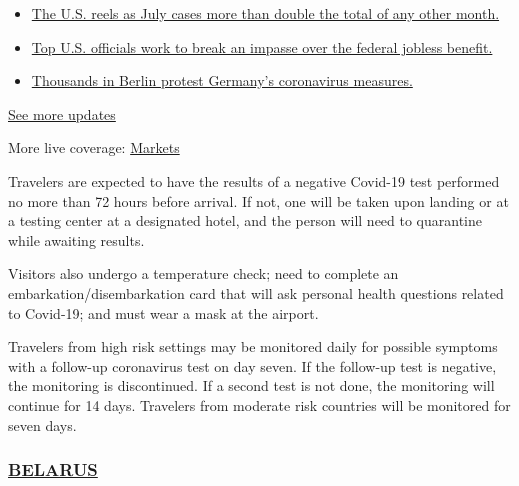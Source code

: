 \begin{itemize}
\tightlist
\item
  \href{https://www.nytimes.com/2020/08/01/world/coronavirus-covid-19.html?action=click\&pgtype=Article\&state=default\&region=MAIN_CONTENT_1\&context=storylines_live_updates\#link-34047410}{The
  U.S. reels as July cases more than double the total of any other
  month.}
\item
  \href{https://www.nytimes.com/2020/08/01/world/coronavirus-covid-19.html?action=click\&pgtype=Article\&state=default\&region=MAIN_CONTENT_1\&context=storylines_live_updates\#link-780ec966}{Top
  U.S. officials work to break an impasse over the federal jobless
  benefit.}
\item
  \href{https://www.nytimes.com/2020/08/01/world/coronavirus-covid-19.html?action=click\&pgtype=Article\&state=default\&region=MAIN_CONTENT_1\&context=storylines_live_updates\#link-25930521}{Thousands
  in Berlin protest Germany's coronavirus measures.}
\end{itemize}

\href{https://www.nytimes.com/2020/08/01/world/coronavirus-covid-19.html?action=click\&pgtype=Article\&state=default\&region=MAIN_CONTENT_1\&context=storylines_live_updates}{See
more updates}

More live coverage:
\href{https://www.nytimes.com/live/2020/07/31/business/stock-market-today-coronavirus?action=click\&pgtype=Article\&state=default\&region=MAIN_CONTENT_1\&context=storylines_live_updates}{Markets}

Travelers are expected to have the results of a negative Covid-19 test
performed no more than 72 hours before arrival. If not, one will be
taken upon landing or at a testing center at a designated hotel, and the
person will need to quarantine while awaiting results.

Visitors also undergo a temperature check; need to complete an
embarkation/disembarkation card that will ask personal health questions
related to Covid-19; and must wear a mask at the airport.

Travelers from high risk settings may be monitored daily for possible
symptoms with a follow-up coronavirus test on day seven. If the
follow-up test is negative, the monitoring is discontinued. If a second
test is not done, the monitoring will continue for 14 days. Travelers
from moderate risk countries will be monitored for seven days.

\hypertarget{belarus}{%
\subsubsection{\texorpdfstring{\href{https://by.usembassy.gov/u-s-citizen-services/covid-19-information/}{BELARUS}}{BELARUS}}\label{belarus}}

